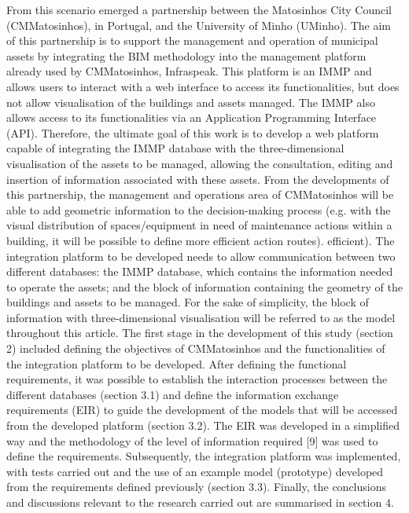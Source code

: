 From this scenario emerged a partnership between the Matosinhos City Council (CMMatosinhos), in Portugal, and the University of Minho (UMinho). The aim of this partnership is to support the management and operation of municipal assets by integrating the BIM methodology into the management platform already used by CMMatosinhos, Infraspeak. This platform is an IMMP and allows users to interact with a web interface to access its functionalities, but does not allow visualisation of the buildings and assets managed. The IMMP also allows access to its functionalities via an Application Programming Interface (API). Therefore, the ultimate goal of this work is to develop a web platform capable of integrating the IMMP database with the three-dimensional visualisation of the assets to be managed, allowing the consultation, editing and insertion of information associated with these assets. From the developments of this partnership, the management and operations area of CMMatosinhos will be able to add geometric information to the decision-making process (e.g. with the visual distribution of spaces/equipment in need of maintenance actions within a building, it will be possible to define more efficient action routes).
efficient). The integration platform to be developed needs to allow communication between two different databases: the IMMP database, which contains the information needed to operate the assets; and the block of information containing the geometry of the buildings and assets to be managed. For the sake of simplicity, the block of information with three-dimensional visualisation will be referred to as the model throughout this article.
The first stage in the development of this study (section 2) included defining the objectives of CMMatosinhos and the functionalities of the integration platform to be developed. After defining the functional requirements, it was possible to establish the interaction processes between the different databases (section 3.1) and define the information exchange requirements (EIR) to guide the development of the models that will be accessed from the developed platform (section 3.2). The EIR was developed in a simplified way and the methodology of the level of information required [9] was used to define the requirements. Subsequently, the integration platform was implemented, with tests carried out and the use of an example model (prototype) developed from the requirements defined previously (section 3.3). Finally, the conclusions and discussions relevant to the research carried out are summarised in section 4.
